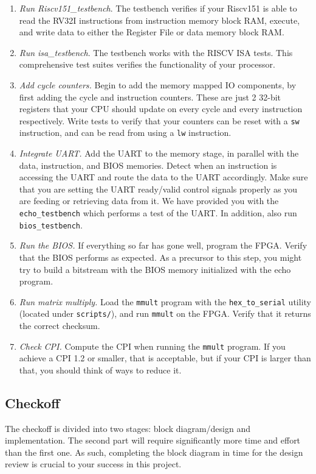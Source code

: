 \documentclass[11pt]{article}
\begin{document}
\begin{enumerate}
  \item \textit{Run Riscv151\_testbench}. The testbench verifies if your Riscv151 is able to read the RV32I instructions from instruction memory block RAM, execute, and write data to either the Register File or data memory block RAM.
  \item \textit{Run isa\_testbench}. The testbench works with the RISCV ISA tests. This comprehensive test suites verifies the functionality of your processor.
  \item \textit{Add cycle counters.} Begin to add the memory mapped IO components, by first adding the cycle and instruction counters. These are just 2 32-bit registers that your CPU should update on every cycle and every instruction respectively. Write tests to verify that your counters can be reset with a \verb|sw| instruction, and can be read from using a \verb|lw| instruction.
  \item \textit{Integrate UART.} Add the UART to the memory stage, in parallel with the data, instruction, and BIOS memories. Detect when an instruction is accessing the UART and route the data to the UART accordingly. Make sure that you are setting the UART ready/valid control signals properly as you are feeding or retrieving data from it. We have provided you with the \verb|echo_testbench| which performs a test of the UART. In addition, also run \verb|bios_testbench|.
  \item \textit{Run the BIOS.} If everything so far has gone well, program the FPGA. Verify that the BIOS performs as expected. As a precursor to this step, you might try to build a bitstream with the BIOS memory initialized with the echo program.
  \item \textit{Run matrix multiply.} Load the \verb|mmult| program with the \verb|hex_to_serial| utility (located under \texttt{scripts/}), and run \verb|mmult| on the FPGA. Verify that it returns the correct checksum.
  \item \textit{Check CPI.} Compute the CPI when running the \verb|mmult| program. If you achieve a CPI 1.2 or smaller, that is acceptable, but if your CPI is larger than that, you should think of ways to reduce it.
\end{enumerate}

\subsection{Checkoff}
The checkoff is divided into two stages: block diagram/design and implementation.
The second part will require significantly more time and effort than the first one.
As such, completing the block diagram in time for the design review is crucial to your success in this project.
\end{document}
